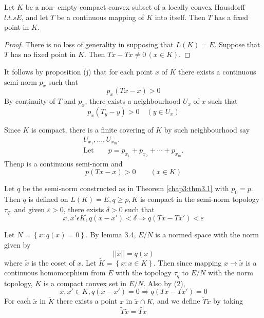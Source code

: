 \begin{thmm}\label{chap3:thm3.2}%
  Let $K$ be a non- empty compact convex subset of a locally convex
  Hausdorff $l.t.s E$, and let $T$ be a continuous mapping of $K$ into
  itself. Then $T$ has a fixed point in $K$. 
\end{thmm}

\begin{proof}
  There is no loss of generality in supposing that $L(K)= E$. Suppose
  that $T$ has no fixed point in $K$. Then $Tx-Tx \neq 0 \, (x \in K)$. 
\end{proof}

It follows by proposition (j) that for each point $x$ of $K$ there
exists a continuous semi-norm $p_x$ such that  
$$
p_x (Tx-x)>0
$$
By continuity of $T$ and $p_x$, there exists a neighbourhood $U_x$ of
$x$ such that  
$$
p_x (T_y - y ) > 0 \quad (y \in U_x)
$$

Since $K$ is compact, there is a finite covering of $K$ by such
neighbourhood say 
\begin{gather*}
  U_{x_1}, \ldots , U_{x_m}.\\
  \text{Let}  \qquad p = p_{x_1} + p_{x_2} + \cdots + p_{x_m}.
\end{gather*}
Then\pageoriginale $p$ is a continuous semi-norm and 
\begin{equation}
  p(Tx-x) > 0 \qquad (x \in K) \tag{1}\label{chap3:eqq1}
\end{equation}

Let $q$ be the semi-norm constructed as in Theorem \ref{chap3:thm3.1}
with $p_0 = 
p$. Then $q$ is defined on $L(K)=E, q \geq p, K$ is compact in the
semi-norm topology $\tau_q$, and given $\varepsilon > 0$, there exists
$\delta > 0$ such that  
\begin{equation}
  x, x' \epsilon K, q(x-x') < \delta \Rightarrow q(Tx- Tx') < \varepsilon
  \tag{2}\label{chap3:eqq2} 
\end{equation}

Let $ N= \left\{ x: q(x)=0 \right\}$. By lemma 3.4,
$E/N$ is a normed space with the norm given by   
$$
||\tilde{x}|| = q(x)
$$ 
where $\tilde{x} $ is the coset of $x$. Let $\tilde{K}= \left\{ x : x
\in K \right\}$. Then since mapping $x \rightarrow \tilde{x}$ is
a continuous homomorphism from $E$ with the topology $\tau_q$ to $E/N$
with the norm topology, $K$ is a compact convex set in $E/N$. Also by
(2), 
\begin{equation}
  x, x' \in K, q(x-x')=0 \Rightarrow q(Tx-Tx')=0
  \tag{3}\label{chap3:eqq3}  
\end{equation}
For each $\tilde{x}$ in $\tilde{K}$ there exists a point $x$ in $
\tilde{x} \cap K$, and we define $\tilde{T} \tilde{x}$ by taking  
 $$
 \tilde{T}\tilde{x}= \widetilde{T x}
 $$

